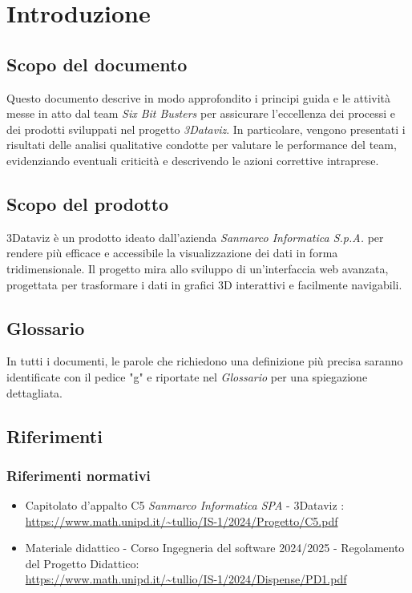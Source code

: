 \section{Introduzione}
    \subsection{Scopo del documento}
        Questo documento descrive in modo approfondito i principi guida e le attività messe in atto dal team \textit{Six Bit Busters} 
        per assicurare l'eccellenza dei processi e dei prodotti sviluppati nel progetto \textit{3Dataviz}. In particolare, vengono 
        presentati i risultati delle analisi qualitative condotte per valutare le performance del team, evidenziando eventuali 
        criticità e descrivendo le azioni correttive intraprese.

    \subsection{Scopo del prodotto}

   3Dataviz è un prodotto ideato dall'azienda \textit{Sanmarco Informatica S.p.A.} per rendere più efficace e accessibile la visualizzazione dei dati in forma tridimensionale. Il progetto mira allo sviluppo di un’interfaccia web avanzata, progettata per trasformare i dati in grafici 3D interattivi e facilmente navigabili.
        
    \subsection{Glossario}
      In tutti i documenti, le parole che richiedono una definizione più precisa saranno identificate con il pedice "g" e riportate nel \textit{Glossario} per una spiegazione dettagliata.
        
    \subsection{Riferimenti}
        \subsubsection{Riferimenti normativi}
        \begin{itemize}
            \item Capitolato d'appalto C5 \textit{Sanmarco Informatica SPA} - 3Dataviz : \\ \url{https://www.math.unipd.it/~tullio/IS-1/2024/Progetto/C5.pdf}
            \item Materiale didattico - Corso Ingegneria del software 2024/2025 - Regolamento del Progetto Didattico: \\ \url{https://www.math.unipd.it/~tullio/IS-1/2024/Dispense/PD1.pdf}
        \end{itemize}
